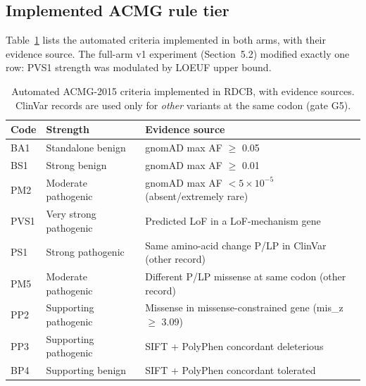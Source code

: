 \documentclass[11pt]{article}
\newcommand{\toprule}{\hline}
\newcommand{\midrule}{\hline}
\newcommand{\bottomrule}{\hline}
\begin{document}
\subsection{Implemented ACMG rule tier}
Table~\ref{tab:acmg} lists the automated criteria implemented in both arms, with
their evidence source. The full-arm v1 experiment (Section~5.2) modified exactly one
row: PVS1 strength was modulated by LOEUF upper bound.

\begin{table}[tb!]
\centering\small
\caption{Automated ACMG-2015 criteria implemented in RDCB, with evidence sources.
ClinVar records are used only for \emph{other} variants at the same codon (gate G5).}
\label{tab:acmg}
\begin{tabular}{llp{5.6cm}}
\toprule
Code & Strength & Evidence source \\
\midrule
BA1 & Standalone benign & gnomAD max AF $\geq$ 0.05 \\
BS1 & Strong benign & gnomAD max AF $\geq$ 0.01 \\
PM2 & Moderate pathogenic & gnomAD max AF $< 5\times10^{-5}$ (absent/extremely rare) \\
PVS1 & Very strong pathogenic & Predicted LoF in a LoF-mechanism gene \\
PS1 & Strong pathogenic & Same amino-acid change P/LP in ClinVar (other record) \\
PM5 & Moderate pathogenic & Different P/LP missense at same codon (other record) \\
PP2 & Supporting pathogenic & Missense in missense-constrained gene (mis\_z $\geq$ 3.09) \\
PP3 & Supporting pathogenic & SIFT + PolyPhen concordant deleterious \\
BP4 & Supporting benign & SIFT + PolyPhen concordant tolerated \\
\bottomrule
\end{tabular}
\end{table}
\end{document}
